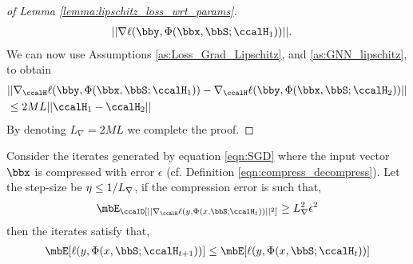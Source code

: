 \begin{proof}[of Lemma \ref{lemma:lipschitz_loss_wrt_params}]
\begin{align}
  &||\nabla\ell(\bby,\Phi(\bbx,\bbS;\ccalH_1))|| .
	\end{align}
	We can now use Assumptions \ref{as:Loss_Grad_Lipschitz}, and \ref{as:GNN_lipschitz}, to obtain
	\begin{align}
		&||\nabla_\ccalH\ell(\bby,\Phi(\bbx,\bbS;\ccalH_1)) - \nabla_\ccalH\ell(\bby,\Phi(\bbx,\bbS;\ccalH_2))  ||\nonumber\\
  &\leq 2ML ||\ccalH_1-\ccalH_2||
	\end{align}
	By denoting $L_\nabla = 2ML$ we complete the proof. 
\end{proof}

\begin{lemma}[Submartingale]\label{lemma:submartingale} 
	Consider the iterates generated by equation \ref{eqn:SGD} where the input vector $\bbx$ is compressed with error $\epsilon$ (cf. Definition \ref{eqn:compress_decompress}). Let the step-size  be $\eta\leq 1/L_\nabla$, if the compression error is such that, 
	\begin{align}\label{eqn:prop_submartingale_condition}
		\mbE_\ccalD[||\nabla_\ccalH \ell (y,\Phi(x,\bbS;\ccalH_t)) ||^2] \geq \lipGrad^2\epsilon^2
	\end{align}
	then the iterates satisfy that, 
	\begin{align}
		\mbE[\ell(y,\Phi(x,\bbS;\ccalH_{t+1}))] \leq \mbE[\ell (y,\Phi(x,\bbS;\ccalH_t))]
	\end{align}
\end{lemma}

